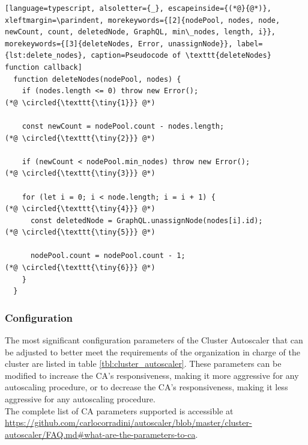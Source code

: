\begin{lstlisting}[language=typescript, alsoletter={_}, escapeinside={(*@}{@*)}, xleftmargin=\parindent, morekeywords={[2]{nodePool, nodes, node, newCount, count, deletedNode, GraphQL, min\_nodes, length, i}}, morekeywords={[3]{deleteNodes, Error, unassignNode}}, label={lst:delete_nodes}, caption=Pseudocode of \texttt{deleteNodes} function callback]
  function deleteNodes(nodePool, nodes) {
    if (nodes.length <= 0) throw new Error();                                                     (*@ \circled{\texttt{\tiny{1}}} @*)

    const newCount = nodePool.count - nodes.length;                                               (*@ \circled{\texttt{\tiny{2}}} @*)

    if (newCount < nodePool.min_nodes) throw new Error();                                         (*@ \circled{\texttt{\tiny{3}}} @*)

    for (let i = 0; i < node.length; i = i + 1) {                                                 (*@ \circled{\texttt{\tiny{4}}} @*)
      const deletedNode = GraphQL.unassignNode(nodes[i].id);                                      (*@ \circled{\texttt{\tiny{5}}} @*)

      nodePool.count = nodePool.count - 1;                                                        (*@ \circled{\texttt{\tiny{6}}} @*)
    }
  }
\end{lstlisting}

\subsubsection{Configuration}
\label{subsubsec:implementation_autoscaling_cluster_autoscaler_configuration}

The most significant configuration parameters of the Cluster Autoscaler that can
be adjusted to better meet the requirements of the organization in charge of the
cluster are listed in table \ref{tbl:cluster_autoscaler}. These parameters can
be modified to increase the CA's responsiveness, making it more aggressive for any
autoscaling procedure, or to decrease the CA's responsiveness, making it less aggressive
for any autoscaling procedure. \\ %
The complete list of CA parameters supported is accessible at \url{https://github.com/carlocorradini/autoscaler/blob/master/cluster-autoscaler/FAQ.md\#what-are-the-parameters-to-ca}.

